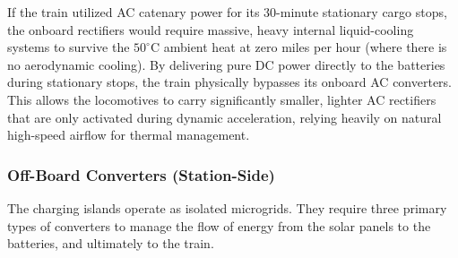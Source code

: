 If the train utilized AC catenary power for its 30-minute stationary cargo stops, the onboard rectifiers would require massive, heavy internal liquid-cooling systems to survive the $50^\circ$C ambient heat at zero miles per hour (where there is no aerodynamic cooling). By delivering pure DC power directly to the batteries during stationary stops, the train physically bypasses its onboard AC converters. This allows the locomotives to carry significantly smaller, lighter AC rectifiers that are only activated during dynamic acceleration, relying heavily on natural high-speed airflow for thermal management.

\subsubsection*{Off-Board Converters (Station-Side)}
The charging islands operate as isolated microgrids. They require three primary types of converters to manage the flow of energy from the solar panels to the batteries, and ultimately to the train.

